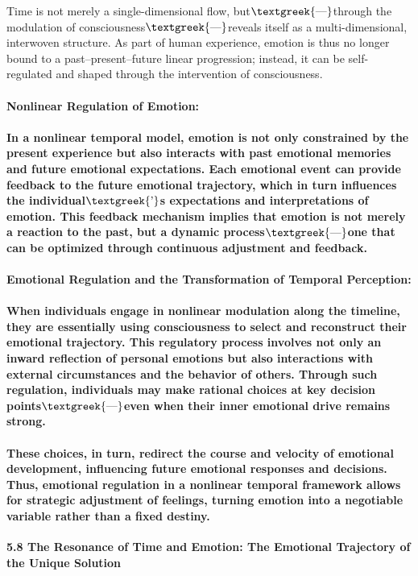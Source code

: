 \documentclass[a4paper]{article}
\begin{document}
Time is not merely a single-dimensional flow, but$\text{\textgreek{—}}$through the modulation of
consciousness$\text{\textgreek{—}}$reveals itself as a multi-dimensional, interwoven structure. As part of human
experience, emotion is thus no longer bound to a past–present–future linear progression; instead, it can be
self-regulated and shaped through the intervention of consciousness.

\paragraph[Nonlinear Regulation of Emotion:]{\textbf{Nonlinear Regulation of Emotion:}}
\paragraph{In a nonlinear temporal model, emotion is not only constrained by the present experience but also interacts
with past emotional memories and future emotional expectations. Each emotional event can provide feedback to the future
emotional trajectory, which in turn influences the individual$\text{\textgreek{’}}$s expectations and interpretations
of emotion. This feedback mechanism implies that emotion is not merely a reaction to the past, but a dynamic
process$\text{\textgreek{—}}$one that can be optimized through continuous adjustment and feedback.}
\paragraph[Emotional Regulation and the Transformation of Temporal Perception:]{\textbf{Emotional Regulation and the
Transformation of Temporal Perception:}}
\paragraph{When individuals engage in nonlinear modulation along the timeline, they are essentially using consciousness
to select and reconstruct their emotional trajectory. This regulatory process involves not only an inward reflection of
personal emotions but also interactions with external circumstances and the behavior of others. Through such
regulation, individuals may make {\textquotedbl}rational{\textquotedbl} choices at key decision
points$\text{\textgreek{—}}$even when their inner emotional drive remains strong. }
\paragraph{These choices, in turn, redirect the course and velocity of emotional development, influencing future
emotional responses and decisions. Thus, emotional regulation in a nonlinear temporal framework allows for strategic
adjustment of feelings, turning emotion into a negotiable variable rather than a fixed destiny.}
\textbf{5.8 The Resonance of Time and Emotion: The Emotional Trajectory of the Unique Solution}
\end{document}
